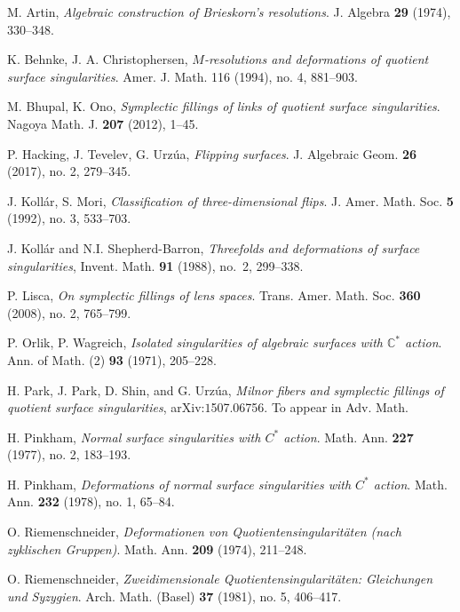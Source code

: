 \documentclass[reqno, twoside, a4paper]{amsart}
\theoremstyle{definition}
\numberwithin{equation}{section}
\begin{document}
\begin{thebibliography}{1}

 M. Artin, \textit{Algebraic construction of Brieskorn's resolutions}. J. Algebra \textbf{29} (1974), 330--348.

 K. Behnke, J. A. Christophersen, \textit{$M$-resolutions and deformations of quotient surface singularities}. Amer. J. Math. 116 (1994),  no. 4, 881--903.

 M. Bhupal, K. Ono, \textit{Symplectic fillings of links of quotient surface singularities}. Nagoya Math. J. \textbf{207} (2012), 1--45.

 P. Hacking, J. Tevelev, G. Urz{\'u}a, \textit{Flipping surfaces}. J. Algebraic Geom. \textbf{26} (2017), no. 2, 279--345.

 J. Koll{\'a}r, S. Mori, \textit{Classification of three-dimensional flips}. J. Amer. Math. Soc. \textbf{5} (1992),  no. 3, 533--703.

 J. Koll{\'a}r and N.I. Shepherd-Barron, \textit{Threefolds and deformations of surface singularities}, Invent. Math. \textbf{91} (1988), no.~2, 299--338.

 P. Lisca, \textit{On symplectic fillings of lens spaces}. Trans. Amer. Math. Soc. \textbf{360} (2008),  no. 2, 765--799.

 P. Orlik, P. Wagreich, \textit{Isolated singularities of algebraic surfaces with $\mathbb{C}^{\ast}$ action}. Ann. of Math. (2) \textbf{93} (1971), 205--228.

 H. Park, J. Park, D. Shin, and G. Urz{\'u}a, \textit{Milnor fibers and symplectic fillings of quotient surface singularities}, arXiv:$1$507.06756. To appear in Adv. Math.

 H. Pinkham, \textit{Normal surface singularities with $C^*$ action}. Math. Ann. \textbf{227} (1977), no. 2, 183--193.

 H. Pinkham, \textit{Deformations of normal surface singularities with $C^*$ action}. Math. Ann. \textbf{232} (1978), no. 1, 65--84.

 O. Riemenschneider, \textit{Deformationen von Quotientensingularit{\"a}ten (nach zyklischen Gruppen)}. Math. Ann. \textbf{209} (1974), 211--248.

 O. Riemenschneider, \textit{Zweidimensionale Quotientensingularitäten: Gleichungen und Syzygien}. Arch. Math. (Basel)  \textbf{37} (1981), no. 5, 406--417.


\end{thebibliography}
\end{document}
